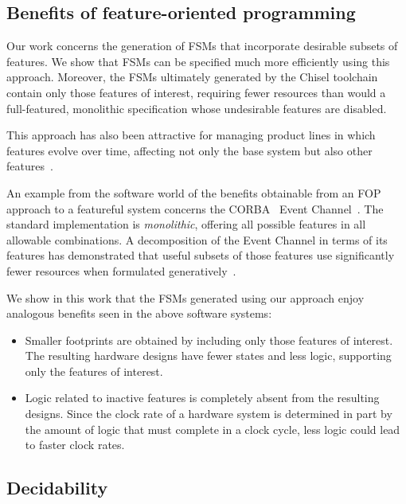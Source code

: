 \documentclass[conference]{IEEEtran}
\begin{document}
\subsection{Benefits of feature-oriented programming}\label{sec:benefop}

Our work concerns the generation of FSMs that incorporate desirable subsets of features.  We show that FSMs can be specified much more efficiently using this approach.  Moreover, the FSMs ultimately generated by the Chisel toolchain contain only those features of interest, requiring fewer resources than would a full-featured, monolithic specification whose undesirable features are disabled.

This approach has also been attractive for managing product lines in which features evolve over time, affecting not only the base system but also other features~\cite{10.1145/2897695.2897701}. 

An example from the software world of the benefits obtainable from an FOP approach to a featureful system concerns the CORBA~\cite{CORBA:00} Event Channel~\cite{CORBAService:02a}. The standard implementation is \emph{monolithic}, offering all possible features in all allowable combinations.  A decomposition of the Event Channel in terms of its features has demonstrated that useful subsets of those features use significantly fewer resources when formulated generatively~\cite{Pratap:04}.   

We show in this work that the FSMs generated using our approach enjoy analogous benefits seen in the above software systems:
\begin{itemize}
    \item Smaller footprints are obtained by including only those features of interest.  The resulting hardware designs have fewer states and less logic, supporting only the features of interest.
    \item Logic related to inactive features is completely absent from the resulting designs. Since the clock rate of a hardware system is determined in part by the amount of logic that must complete in a clock cycle, less logic could lead to faster clock rates.
\end{itemize}

  
\subsection{Decidability}\label{sec:decide}
\end{document}
